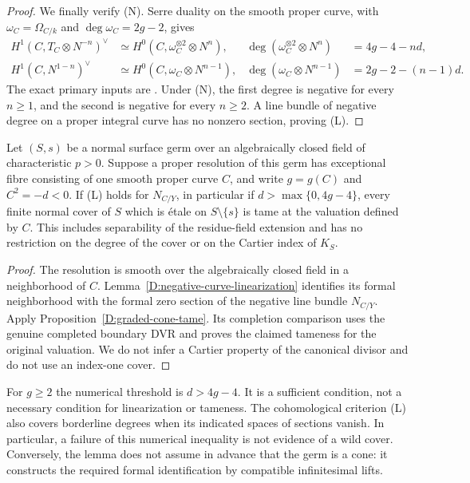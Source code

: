 \begin{proof}
We finally verify (N).  Serre duality on the smooth proper
curve, with $\omega_C=\Omega_{C/k}$ and $\deg\omega_C=2g-2$,
gives
\[
 \begin{aligned}
 H^1(C,T_C\otimes N^{-n})^\vee
    &\simeq H^0(C,\omega_C^{\otimes2}\otimes N^n),
       &\deg(\omega_C^{\otimes2}\otimes N^n)&=4g-4-nd,\\
 H^1(C,N^{1-n})^\vee
    &\simeq H^0(C,\omega_C\otimes N^{n-1}),
       &\deg(\omega_C\otimes N^{n-1})&=2g-2-(n-1)d.
 \end{aligned}
\]
The exact primary inputs are
\cite[Lemmas 53.4.1 and 53.5.2, tags 0BS2 and 0BS6]
     {StacksBNegativeCurve}.
Under (N), the first degree is negative for every $n\geq1$,
and the second is negative for every $n\geq2$.
A line bundle of negative degree on a proper integral curve
has no nonzero section, proving (L).
\end{proof}

\begin{corollary}
\label{D:negative-curve-tame}
Let $(S,s)$ be a normal surface germ over an algebraically closed
field of characteristic $p>0$.  Suppose a proper resolution of
this germ has exceptional fibre consisting of one smooth proper
curve $C$, and write $g=g(C)$ and $C^2=-d<0$.  If (L) holds for
$N_{C/Y}$, in particular if $d>\max\{0,4g-4\}$, every finite
normal cover of $S$ which is \'etale on $S\setminus\{s\}$ is
tame at the valuation defined by $C$.  This includes separability
of the residue-field extension and has no restriction on the
degree of the cover or on the Cartier index of $K_S$.
\end{corollary}

\begin{proof}
The resolution is smooth over the algebraically closed field
in a neighborhood of $C$.  Lemma~\ref{D:negative-curve-linearization}
identifies its formal neighborhood with the formal zero section
of the negative line bundle $N_{C/Y}$.  Apply
Proposition~\ref{D:graded-cone-tame}.  Its completion comparison
uses the genuine completed boundary DVR and proves the claimed
tameness for the original valuation.  We do not infer a Cartier
property of the canonical divisor and do not use an index-one
cover.
\end{proof}

\begin{remark}
For $g\geq2$ the numerical threshold is $d>4g-4$.
It is a sufficient condition, not a necessary condition for
linearization or tameness.  The cohomological criterion (L)
also covers borderline degrees when its indicated spaces of
sections vanish.  In particular, a failure of this numerical
inequality is not evidence of a wild cover.  Conversely, the
lemma does not assume in advance that the germ is a cone: it
constructs the required formal identification by compatible
infinitesimal lifts.
\end{remark}
